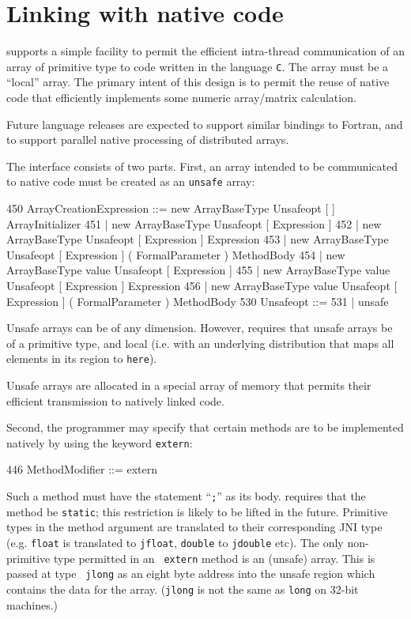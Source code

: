 \chapter{Linking with native code}\label{extern}
\XtenCurrVer{} supports a simple facility to permit the efficient
intra-thread communication of an array of primitive type to code
written in the language {\tt C}.  The array must be a ``local''
array. The primary intent of this design is to permit the reuse of
native code that efficiently implements some numeric array/matrix
calculation.

Future language releases are expected to support similar bindings to
{\sc Fortran}, and to support parallel native processing of
distributed \Xten{} arrays. 

The interface consists of two parts. First, an array intended to be
communicated to native code must be created as an {\tt unsafe} array:
\begin{x10}
450 ArrayCreationExpression ::= 
      new ArrayBaseType Unsafeopt [ ] 
        ArrayInitializer
451   | new ArrayBaseType Unsafeopt [ Expression ]
452   | new ArrayBaseType Unsafeopt 
          [ Expression ] Expression
453   | new ArrayBaseType Unsafeopt [ Expression ] 
          ( FormalParameter ) MethodBody
454   | new ArrayBaseType value 
           Unsafeopt [ Expression ]
455   | new ArrayBaseType value 
           Unsafeopt [ Expression ] Expression
456   | new ArrayBaseType value 
        Unsafeopt [ Expression ] 
          ( FormalParameter ) MethodBody
530   Unsafeopt ::=
531     | unsafe
\end{x10}
Unsafe arrays can be of any dimension. However, \XtenCurrVer{}
requires that unsafe arrays be of a primitive type, and local (i.e.{}
with an underlying distribution that maps all elements in its region
to {\tt here}).

Unsafe arrays are allocated in a special array of memory that permits
their efficient transmission to natively linked code.

Second, the \Xten{} programmer may specify that certain methods are to
be implemented natively by using the keyword {\tt extern}:
\begin{x10}
446   MethodModifier ::= extern
\end{x10}
Such a method must have the statement ``{\tt ;}'' as its body.
\XtenCurrVer{} requires that the method be {\tt static}; this
restriction is likely to be lifted in the future.  Primitive types in
the method argument are translated to their corresponding JNI type
(e.g.{} {\tt float} is translated to {\tt jfloat}, {\tt double} to
{\tt jdouble} etc).  The only non-primitive type permitted in an {\tt
extern} method is an (unsafe) array. This is passed at type {\tt
jlong} as an eight byte address into the unsafe region which contains
the data for the array. ({\tt jlong} is not the same as {\tt long} on
32-bit machines.)


